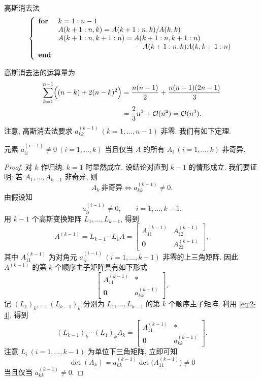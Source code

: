 \begin{algorithm}{高斯消去法}
  \label{alg:2-1}
\[
  \left\{
  \begin{array}{ll}
    \textbf{for} & k=1:n-1\\
    & A(k+1:n,k)=A(k+1:n,k)/A(k,k)\\
    & A(k+1:n,k+1:n)=A(k+1:n,k+1:n)\\
    & \hphantom{A(k+1:n,k+1:n)={}}-A(k+1:n,k)A(k,k+1:n)\\
    \textbf{end}
  \end{array}
  \right.
\]
\end{algorithm}

高斯消去法的运算量为
\[
  \begin{aligned}
    \sum_{k=1}^{n-1}\Bigl((n-k)+2(n-k)^2\Bigr)
    &=\frac{n(n-1)}{2}+\frac{n(n-1)(2n-1)}{3}\\
    &=\frac{2}{3}n^3+\mathcal{O}(n^2)=\mathcal{O}(n^3).
  \end{aligned}
\]
注意, 高斯消去法要求 $a_{kk}^{(k-1)}\ (k=1,\ldots,n-1)$ 非零. 我们有如下定理.

\begin{theorem}
\label{thm:2-1}
元素 $a_{ii}^{(i-1)}\neq0\ (i=1,\ldots,k)$ 当且仅当 $A$ 的所有 $A_i\ (i=1,\ldots,k)$ 非奇异.
\end{theorem}

\begin{proof}
对 $k$ 作归纳. $k=1$ 时显然成立. 设结论对直到 $k-1$ 的情形成立. 我们要证明: 若 $A_1,\ldots,A_{k-1}$ 非奇异, 则
\[
  A_k\ \text{非奇异}\iff a_{kk}^{(k-1)}\neq0.
\]
由假设知
\[
  a_{ii}^{(i-1)}\neq0,\qquad i=1,\ldots,k-1.
\]
用 $k-1$ 个高斯变换矩阵 $L_1,\ldots,L_{k-1}$, 得到
\begin{equation}
  A^{(k-1)}=L_{k-1}\cdots L_1A=
  \begin{bmatrix}
    A_{11}^{(k-1)} & A_{12}^{(k-1)}\\
    \mathbf{0}     & A_{22}^{(k-1)}
  \end{bmatrix},
  \label{eq:2-4}
\end{equation}
其中 $A_{11}^{(k-1)}$ 为对角元 $a_{ii}^{(i-1)}\ (i=1,\ldots,k-1)$ 非零的上三角矩阵. 因此 $A^{(k-1)}$ 的第 $k$ 个顺序主子矩阵具有如下形式
\[
  \begin{bmatrix}
    A_{11}^{(k-1)} & *\\
    \mathbf{0}     & a_{kk}^{(k-1)}
  \end{bmatrix}.
\]
记 $(L_1)_k,\ldots,(L_{k-1})_k$ 分别为 $L_1,\ldots,L_{k-1}$ 的第 $k$ 个顺序主子矩阵. 利用 \eqref{eq:2-4}, 得到
\[
  (L_{k-1})_k\cdots(L_1)_kA_k=
  \begin{bmatrix}
    A_{11}^{(k-1)} & *\\
    \mathbf{0}     & a_{kk}^{(k-1)}
  \end{bmatrix}.
\]
注意 $L_i\ (i=1,\ldots,k-1)$ 为单位下三角矩阵, 立即可知
\[
  \det(A_k)=a_{kk}^{(k-1)}\det\bigl(A_{11}^{(k-1)}\bigr)\neq0
\]
当且仅当 $a_{kk}^{(k-1)}\neq0$.
\end{proof}

